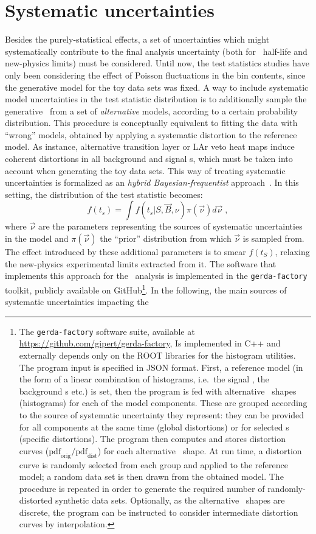 \section{Systematic uncertainties}%
\label{sec:2nbb-ana:systematics}

Besides the purely-statistical effects, a set of uncertainties which might systematically
contribute to the final analysis uncertainty (both for \nnbb\ half-life and new-physics
limits) must be considered. Until now, the test statistics studies have only been
considering the effect of Poisson fluctuations in the bin contents, since the generative
model for the toy data sets was fixed. A way to include systematic model uncertainties in
the test statistic distribution is to additionally sample the generative \pdf\ from a set
of \emph{alternative} models, according to a certain probability distribution. This
procedure is conceptually equivalent to fitting the data with ``wrong'' models, obtained
by applying a systematic distortion to the reference model. As instance, alternative
transition layer or LAr veto heat maps induce coherent distortions in all background and
signal \pdf{}s, which must be taken into account when generating the toy data sets.
\newpar
This way of treating systematic uncertainties is formalized as an \emph{hybrid
Bayesian-frequentist} approach~\cite{Zyla2020}. In this setting, the distribution
of the test statistic becomes:
\[
  f(t_s) = \int f(t_s | S, \vec{B}, \nu) \pi(\vec{\nu}) d\vec{\nu} \;,
\]
where $\vec{\nu}$ are the parameters representing the sources of systematic uncertainties
in the model and $\pi(\vec{\nu})$ the ``prior'' distribution from which $\vec{\nu}$ is
sampled from. The effect introduced by these additional parameters is to smear $f(t_S)$,
relaxing the new-physics experimental limits extracted from it. The software that
implements this approach for the \nnbb\ analysis is implemented in the
\texttt{gerda-factory} toolkit, publicly available on GitHub\footnote{%
  The \texttt{gerda-factory} software suite, available at
  \url{https://github.com/gipert/gerda-factory}, Is implemented in C++ and externally
  depends only on the ROOT libraries for the histogram utilities. The program input is
  specified in JSON format. First, a reference model (in the form of a linear combination
  of histograms, i.e.~the signal \pdf, the background \pdf{}s etc.) is set, then the program
  is fed with alternative \pdf\ shapes (histograms) for each of the model components. These
  are grouped according to the source of systematic uncertainty they represent: they can
  be provided for all components at the same time (global distortions) or for selected
  \pdf{}s (specific distortions). The program then computes and stores distortion curves
  ($\text{pdf}_\text{orig}/\text{pdf}_\text{dist}$) for each alternative \pdf\ shape. At run
  time, a distortion curve is randomly selected from each group and applied to the
  reference model; a random data set is then drawn from the obtained model. The procedure
  is repeated in order to generate the required number of randomly-distorted synthetic
  data sets. Optionally, as the alternative \pdf\ shapes are discrete, the program can be
  instructed to consider intermediate distortion curves by interpolation.
}. In the following, the main sources of systematic uncertainties impacting the \nnbb\

